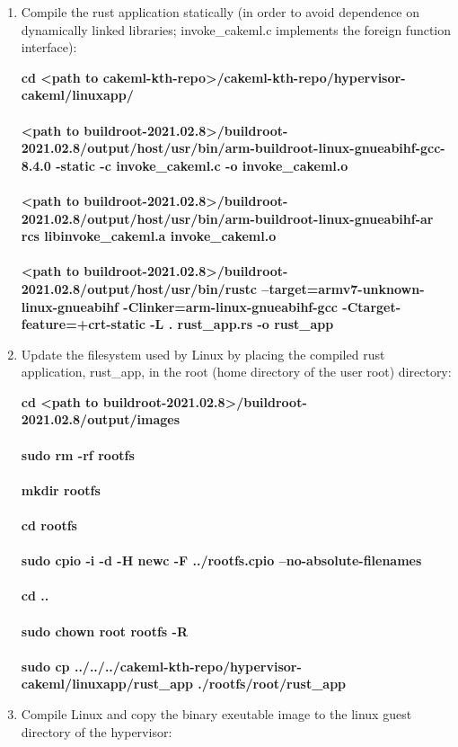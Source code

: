 \documentclass[11pt, a4paper]{article}
\begin{document}
\begin{enumerate}
\item
	Compile the rust application statically (in order to avoid dependence on
	dynamically linked libraries; invoke\_cakeml.c implements the foreign
	function interface):

		\textbf{cd \textless path to cakeml-kth-repo\textgreater/cakeml-kth-repo/hypervisor-cakeml/linuxapp/}
\\\\
		\textbf{\textless path to buildroot-2021.02.8\textgreater/buildroot-2021.02.8/output/host/usr/bin/arm-buildroot-linux-gnueabihf-gcc-8.4.0 -static -c invoke\_cakeml.c -o invoke\_cakeml.o}
\\\\
		\textbf{\textless path to buildroot-2021.02.8\textgreater/buildroot-2021.02.8/output/host/usr/bin/arm-buildroot-linux-gnueabihf-ar rcs libinvoke\_cakeml.a invoke\_cakeml.o}
\\\\
		\textbf{\textless path to buildroot-2021.02.8\textgreater/buildroot-2021.02.8/output/host/usr/bin/rustc --target=armv7-unknown-linux-gnueabihf -Clinker=arm-linux-gnueabihf-gcc -Ctarget-feature=+crt-static -L . rust\_app.rs -o rust\_app}
\item
	Update the filesystem used by Linux by placing the compiled rust
	application, rust\_app, in the root (home directory of the user root)
	directory:

		\textbf{cd \textless path to buildroot-2021.02.8\textgreater/buildroot-2021.02.8/output/images}
\\\\
		\textbf{sudo rm -rf rootfs}
\\\\
		\textbf{mkdir rootfs}
\\\\
		\textbf{cd rootfs}
\\\\
		\textbf{sudo cpio -i -d -H newc -F ../rootfs.cpio --no-absolute-filenames}
\\\\
		\textbf{cd ..}
\\\\
		\textbf{sudo chown root rootfs -R}
\\\\
		\textbf{sudo cp ../../../cakeml-kth-repo/hypervisor-cakeml/linuxapp/rust\_app ./rootfs/root/rust\_app}
\item
	Compile Linux and copy the binary exeutable image to the linux guest directory of the hypervisor:


\end{enumerate}
\end{document}

